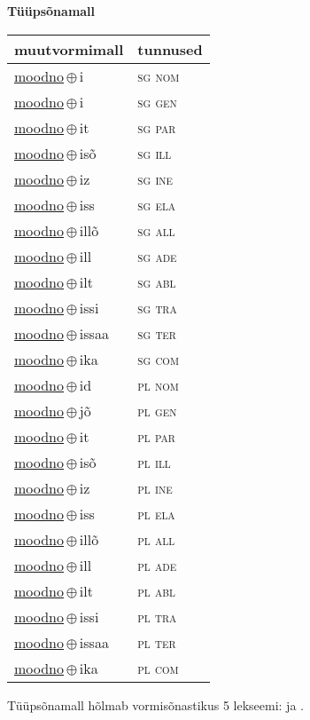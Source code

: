 

\vspace{3.5em}
\noindent \begin{minipage}{\textwidth}
\noindent \textbf{Tüüpsõnamall \,}\\

\begin{sideways}
\begin{tabular}{l l}
muutvormimall & tunnused \\
\hline
\underline{moodno}\,$\oplus$\,i & \textsc{ sg nom } \\
\underline{moodno}\,$\oplus$\,i & \textsc{ sg gen } \\
\underline{moodno}\,$\oplus$\,it & \textsc{ sg par } \\
\underline{moodno}\,$\oplus$\,isõ & \textsc{ sg ill } \\
\underline{moodno}\,$\oplus$\,iz & \textsc{ sg ine } \\
\underline{moodno}\,$\oplus$\,iss & \textsc{ sg ela } \\
\underline{moodno}\,$\oplus$\,illõ & \textsc{ sg all } \\
\underline{moodno}\,$\oplus$\,ill & \textsc{ sg ade } \\
\underline{moodno}\,$\oplus$\,ilt & \textsc{ sg abl } \\
\underline{moodno}\,$\oplus$\,issi & \textsc{ sg tra } \\
\underline{moodno}\,$\oplus$\,issaa & \textsc{ sg ter } \\
\underline{moodno}\,$\oplus$\,ika & \textsc{ sg com } \\
\underline{moodno}\,$\oplus$\,id & \textsc{ pl nom } \\
\underline{moodno}\,$\oplus$\,jõ & \textsc{ pl gen } \\
\underline{moodno}\,$\oplus$\,it & \textsc{ pl par } \\
\underline{moodno}\,$\oplus$\,isõ & \textsc{ pl ill } \\
\underline{moodno}\,$\oplus$\,iz & \textsc{ pl ine } \\
\underline{moodno}\,$\oplus$\,iss & \textsc{ pl ela } \\
\underline{moodno}\,$\oplus$\,illõ & \textsc{ pl all } \\
\underline{moodno}\,$\oplus$\,ill & \textsc{ pl ade } \\
\underline{moodno}\,$\oplus$\,ilt & \textsc{ pl abl } \\
\underline{moodno}\,$\oplus$\,issi & \textsc{ pl tra } \\
\underline{moodno}\,$\oplus$\,issaa & \textsc{ pl ter } \\
\underline{moodno}\,$\oplus$\,ika & \textsc{ pl com } \\
\end{tabular}
\end{sideways}
\label{tab:tüüpsõnamall-moodnoi}

\end{minipage}

 
\vspace{1em}
\noindent Tüüpsõnamall  hõlmab vormisõnastikus 5 lekseemi:  ja .
